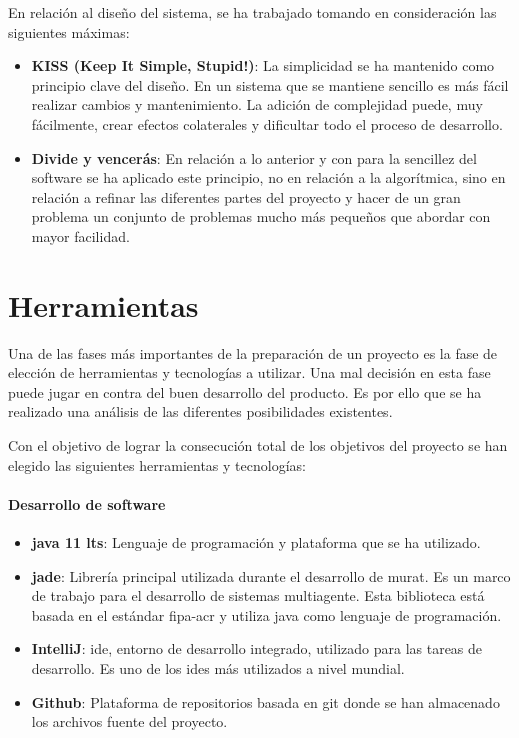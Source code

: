 En relación al diseño del sistema, se ha trabajado tomando en consideración las siguientes máximas: 
\begin{itemize}
    \item \textbf{KISS (Keep It Simple, Stupid!)}: La simplicidad se ha mantenido como principio clave del diseño. En un sistema que se mantiene sencillo es más fácil realizar cambios y mantenimiento. La adición de complejidad puede, muy fácilmente, crear efectos colaterales y dificultar todo el proceso de desarrollo.
    \item \textbf{Divide y vencerás}: En relación a lo anterior y con para la sencillez del software se ha aplicado este principio, no en relación a la algorítmica, sino en relación a refinar las diferentes partes del proyecto y hacer de un gran problema un conjunto de problemas mucho más pequeños que abordar con mayor facilidad.
\end{itemize}


\section{Herramientas}
Una de las fases más importantes de la preparación de un proyecto es la fase de elección de herramientas y tecnologías a utilizar. Una mal decisión en esta fase puede jugar en contra del buen desarrollo del producto. Es por ello que se ha realizado una análisis de las diferentes posibilidades existentes.

Con el objetivo de lograr la consecución total de los objetivos del proyecto se han elegido las siguientes herramientas y tecnologías:

\paragraph{Desarrollo de software}
\begin{itemize}
    \item \textbf{\Gls{java} 11 \acrshort{lts}}: Lenguaje de programación y plataforma que se ha utilizado.
    \item \textbf{\acrshort{jade}}: Librería principal utilizada durante el desarrollo de \acrshort{murat}. Es un marco de trabajo para el desarrollo de sistemas multiagente. Esta biblioteca está basada en el estándar \acrshort{fipa-acr} y utiliza \Gls{java} como lenguaje de programación.
    \item \textbf{IntelliJ}: \acrfull{ide}, entorno de desarrollo integrado, utilizado para las tareas de desarrollo. Es uno de los \acrshort{ide}s más utilizados a nivel mundial.
    \item \textbf{Github}: Plataforma de repositorios basada en \Gls{git} donde se han almacenado los archivos fuente del proyecto.
\end{itemize}

